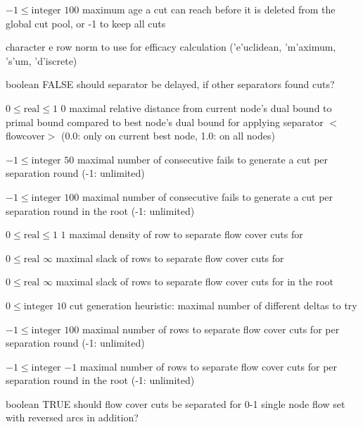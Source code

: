%
{$-1\leq\textrm{integer}$}%
{$100$}%
{maximum age a cut can reach before it is deleted from the global cut pool, or -1 to keep all cuts}%
{}

%
{character}%
{e}%
{row norm to use for efficacy calculation ('e'uclidean, 'm'aximum, 's'um, 'd'iscrete)}%
{}

%
{boolean}%
{FALSE}%
{should separator be delayed, if other separators found cuts?}%
{}

%
{$0\leq\textrm{real}\leq1$}%
{$0$}%
{maximal relative distance from current node's dual bound to primal bound compared to best node's dual bound for applying separator $<$flowcover$>$ (0.0: only on current best node, 1.0: on all nodes)}%
{}

%
{$-1\leq\textrm{integer}$}%
{$50$}%
{maximal number of consecutive fails to generate a cut per separation round (-1: unlimited)}%
{}

%
{$-1\leq\textrm{integer}$}%
{$100$}%
{maximal number of consecutive fails to generate a cut per separation round in the root (-1: unlimited)}%
{}

%
{$0\leq\textrm{real}\leq1$}%
{$1$}%
{maximal density of row to separate flow cover cuts for}%
{}

%
{$0\leq\textrm{real}$}%
{$\infty$}%
{maximal slack of rows to separate flow cover cuts for}%
{}

%
{$0\leq\textrm{real}$}%
{$\infty$}%
{maximal slack of rows to separate flow cover cuts for in the root}%
{}

%
{$0\leq\textrm{integer}$}%
{$10$}%
{cut generation heuristic: maximal number of different deltas to try}%
{}

%
{$-1\leq\textrm{integer}$}%
{$100$}%
{maximal number of rows to separate flow cover cuts for per separation round (-1: unlimited)}%
{}

%
{$-1\leq\textrm{integer}$}%
{$-1$}%
{maximal number of rows to separate flow cover cuts for per separation round in the root (-1: unlimited)}%
{}

%
{boolean}%
{TRUE}%
{should flow cover cuts be separated for 0-1 single node flow set with reversed arcs in addition?}%
{}

